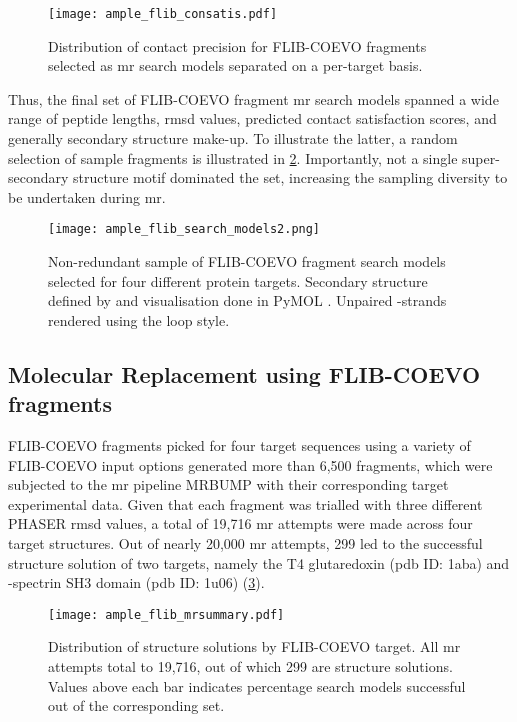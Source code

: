 \begin{figure}[H]
	\centering
	\texttt{[image: ample\_flib\_consatis.pdf]}
	\caption[Distribution of contact precision for FLIB-COEVO fragments]{Distribution of contact precision for FLIB-COEVO fragments selected as \gls{mr} search models separated on a per-target basis.}
	\label{fig:ample_flib_consatis}
\end{figure}

Thus, the final set of FLIB-COEVO fragment \gls{mr} search models spanned a wide range of peptide lengths, \gls{rmsd} values, predicted contact satisfaction scores, and generally secondary structure make-up. To illustrate the latter, a random selection of sample fragments is illustrated in \cref{fig:ample_flib_search_models}. Importantly, not a single super-secondary structure motif dominated the set, increasing the sampling diversity to be undertaken during \gls{mr}.

\begin{figure}[H]
	\centering
	\texttt{[image: ample\_flib\_search\_models2.png]}
	\caption[Fragment search models derived from FLIB-COEVO]{Non-redundant sample of FLIB-COEVO fragment search models selected for four different protein targets. Secondary structure defined by and visualisation done in PyMOL \cite{Delano2002-hm}. Unpaired \textbeta-strands rendered using the loop style.}
	\label{fig:ample_flib_search_models}
\end{figure}

\subsection{Molecular Replacement using FLIB-COEVO fragments}
FLIB-COEVO fragments picked for four target sequences using a variety of FLIB-COEVO input options generated more than 6,500 fragments, which were subjected to the \gls{mr} pipeline MRBUMP with their corresponding target experimental data. Given that each fragment was trialled with three different PHASER \gls{rmsd} values, a total of 19,716 \gls{mr} attempts were made across four target structures. Out of nearly 20,000 \gls{mr} attempts, 299 led to the successful structure solution of two targets, namely the T4 glutaredoxin (\gls{pdb} ID: 1aba) and \textalpha-spectrin SH3 domain (\gls{pdb} ID: 1u06) (\cref{fig:ample_flib_mrsummary}).

\begin{figure}[H]
	\centering
	\texttt{[image: ample\_flib\_mrsummary.pdf]}
	\caption[MR structure solutions by FLIB-COEVO target]{Distribution of structure solutions by FLIB-COEVO target. All \gls{mr} attempts total to 19,716, out of which 299 are structure solutions. Values above each bar indicates percentage search models successful out of the corresponding set.}
	\label{fig:ample_flib_mrsummary}
\end{figure}

